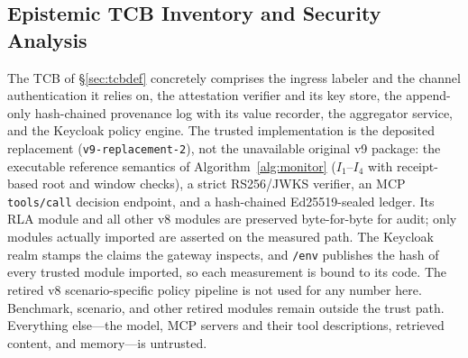 \documentclass[conference,compsoc]{IEEEtran}
\theoremstyle{definition}
\theoremstyle{plain}
\newcommand{\Ione}{\ensuremath{I_1}}
\newcommand{\Ifour}{\ensuremath{I_4}}
\begin{document}
\subsection{Epistemic TCB Inventory and Security Analysis}
\label{sec:tcb}
\label{sec:security}
The TCB of \S\ref{sec:tcbdef} concretely comprises the ingress labeler
and the channel authentication it relies on, the attestation verifier
and its key store, the append-only hash-chained provenance log with its
value recorder, the aggregator service, and the Keycloak policy engine.
The trusted implementation is the deposited replacement
(\texttt{v9-replacement-2}), not the unavailable original v9 package:
the executable reference semantics of Algorithm~\ref{alg:monitor}
(\Ione--\Ifour{} with receipt-based root and window checks), a strict
RS256/JWKS verifier, an MCP \texttt{tools/call} decision endpoint, and a
hash-chained Ed25519-sealed ledger. Its RLA module and all other v8
modules are preserved byte-for-byte for audit; only modules actually
imported are asserted on the measured path. The Keycloak realm stamps
the claims the gateway inspects, and \texttt{/env} publishes the hash of
every trusted module imported, so each measurement is bound to its code.
The retired v8 scenario-specific policy pipeline is not used for any
number here. Benchmark, scenario, and other retired modules remain
outside the trust path. Everything else---the model, MCP servers and
their tool descriptions, retrieved content, and memory---is untrusted.
\end{document}
